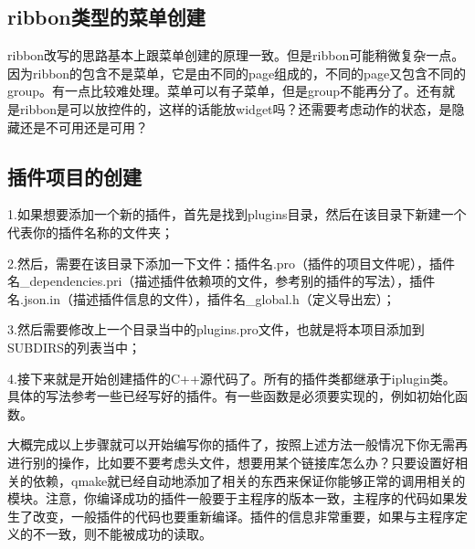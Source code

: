 \subsection{ribbon类型的菜单创建}
ribbon改写的思路基本上跟菜单创建的原理一致。但是ribbon可能稍微复杂一点。因为ribbon的包含不是菜单，它是由不同的page组成的，不同的page又包含不同的group。有一点比较难处理。菜单可以有子菜单，但是group不能再分了。还有就是ribbon是可以放控件的，这样的话能放widget吗？还需要考虑动作的状态，是隐藏还是不可用还是可用？
\subsection{插件项目的创建}
1.如果想要添加一个新的插件，首先是找到plugins目录，然后在该目录下新建一个代表你的插件名称的文件夹；

2.然后，需要在该目录下添加一下文件：插件名.pro（插件的项目文件呢），插件名\_dependencies.pri（描述插件依赖项的文件，参考别的插件的写法），插件名.json.in（描述插件信息的文件），插件名\_global.h（定义导出宏）；

3.然后需要修改上一个目录当中的plugins.pro文件，也就是将本项目添加到SUBDIRS的列表当中；

4.接下来就是开始创建插件的C++源代码了。所有的插件类都继承于iplugin类。具体的写法参考一些已经写好的插件。有一些函数是必须要实现的，例如初始化函数。

大概完成以上步骤就可以开始编写你的插件了，按照上述方法一般情况下你无需再进行别的操作，比如要不要考虑头文件，想要用某个链接库怎么办？只要设置好相关的依赖，qmake就已经自动地添加了相关的东西来保证你能够正常的调用相关的模块。注意，你编译成功的插件一般要于主程序的版本一致，主程序的代码如果发生了改变，一般插件的代码也要重新编译。插件的信息非常重要，如果与主程序定义的不一致，则不能被成功的读取。

